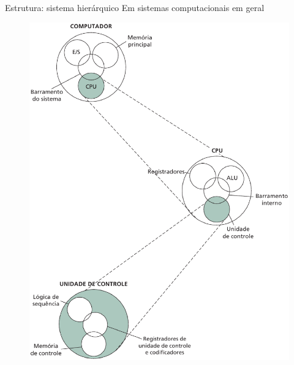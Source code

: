  \begin{slide}[toc=]{Estrutura: sistema hierárquico}
    Em sistemas computacionais em geral
    \begin{figure}[h]
      \centering
      \includegraphics[height = 0.73\textheight]{figs/estrutura.eps}
    \end{figure}
\end{slide}
 
